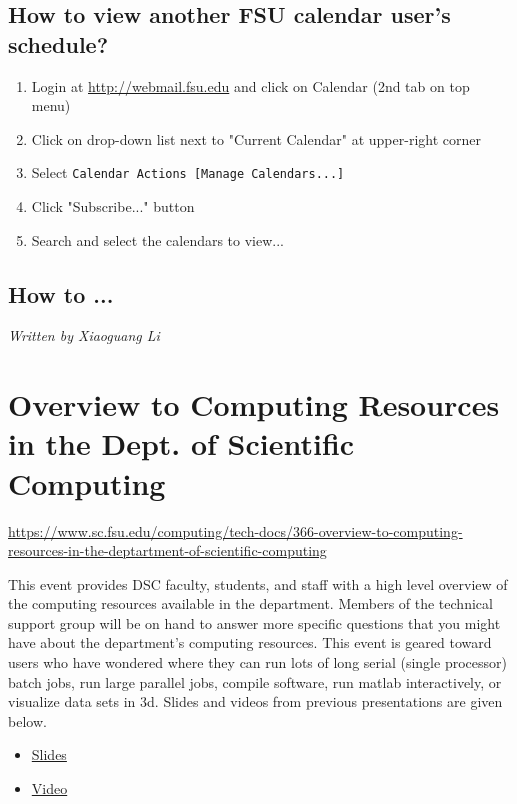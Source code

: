 \documentclass[12pt,a4paper]{article}
\begin{document}
\subsection*{How to view another FSU calendar user's schedule?}
\begin{enumerate}
    \item Login at \url{http://webmail.fsu.edu} and click on Calendar (2nd tab on top menu)
    \item Click on drop-down list next to "Current Calendar" at upper-right corner
    \item Select \texttt{Calendar Actions [Manage Calendars...]}
    \item Click "Subscribe..." button
    \item Search and select the calendars to view...
\end{enumerate}

\subsection*{How to ...}
\hfill \textit{Written by Xiaoguang Li}

\section{Overview to Computing Resources in the Dept. of Scientific Computing}
\url{https://www.sc.fsu.edu/computing/tech-docs/366-overview-to-computing-resources-in-the-deptartment-of-scientific-computing}

This event provides DSC faculty, students, and staff with a high level overview of the computing resources available in the department. Members of the technical support group will be on hand to answer more specific questions that you might have about the department's computing resources. This event is geared toward users who have wondered where they can run lots of long serial (single processor) batch jobs, run large parallel jobs, compile software, run matlab interactively, or visualize data sets in 3d. Slides and videos from previous presentations are given below.
\begin{itemize}
    \item \href{https://www.sc.fsu.edu/computing/tech-docs/attachments/366-overview-to-computing-resources-in-the-deptartment-of-scientific-computing/computing_overview.pdf}{Slides}
    \item \href{http://www.youtube.com/watch?v=kUizd2owLh8}{Video}
\end{itemize}
\end{document}
